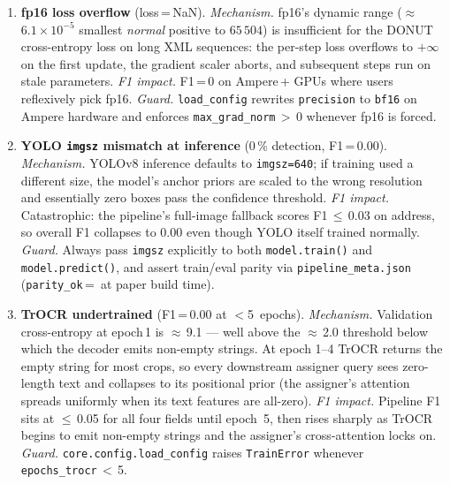 \begin{enumerate}
\item \textbf{fp16 loss overflow} (loss\,=\,NaN).
  \textit{Mechanism.} fp16's dynamic range
  ($\approx$\,$6.1{\times}10^{-5}$ smallest \emph{normal} positive
  to $65\,504$) is insufficient for
  the DONUT cross-entropy loss on long XML sequences: the per-step
  loss overflows to $+\infty$ on the first update, the gradient
  scaler aborts, and subsequent steps run on stale parameters.
  \textit{F1 impact.} F1\,=\,0 on Ampere\,+ GPUs where users
  reflexively pick fp16.  \textit{Guard.} \texttt{load\_config}
  rewrites \texttt{precision} to \texttt{bf16} on Ampere hardware
  and enforces \texttt{max\_grad\_norm}\,$>$\,0 whenever fp16 is
  forced.

\item \textbf{YOLO \texttt{imgsz} mismatch at inference}
  (0\,\% detection, F1\,=\,0.00).
  \textit{Mechanism.} YOLOv8 inference defaults to
  \texttt{imgsz=640}; if training used a different size, the model's
  anchor priors are scaled to the wrong resolution and essentially
  zero boxes pass the confidence threshold.  \textit{F1 impact.}
  Catastrophic: the pipeline's full-image fallback scores
  F1\,$\leq$\,0.03 on address, so overall F1 collapses to 0.00
  even though YOLO itself trained normally.  \textit{Guard.} Always
  pass \texttt{imgsz} explicitly to both \texttt{model.train()} and
  \texttt{model.predict()}, and assert train/eval parity via
  \texttt{pipeline\_meta.json}
  (\texttt{parity\_ok}\,=\, at paper build time).

\item \textbf{TrOCR undertrained} (F1\,=\,0.00 at $<$5~epochs).
  \textit{Mechanism.} Validation cross-entropy at epoch\,1 is
  $\approx$\,9.1 --- well above the $\approx$\,2.0 threshold below
  which the decoder emits non-empty strings.  At epoch 1--4 TrOCR
  returns the empty string for most crops, so every downstream
  assigner query sees zero-length text and collapses to its positional
  prior (the assigner's attention spreads uniformly when its text
  features are all-zero).  \textit{F1 impact.} Pipeline F1 sits at
  $\leq$\,0.05 for all four fields until epoch~5, then rises sharply
  as TrOCR begins to emit non-empty strings and the assigner's
  cross-attention locks on.  \textit{Guard.}
  \texttt{core.config.load\_config} raises \texttt{TrainError}
  whenever \texttt{epochs\_trocr}\,$<$\,5.



\end{enumerate}
\fussy


